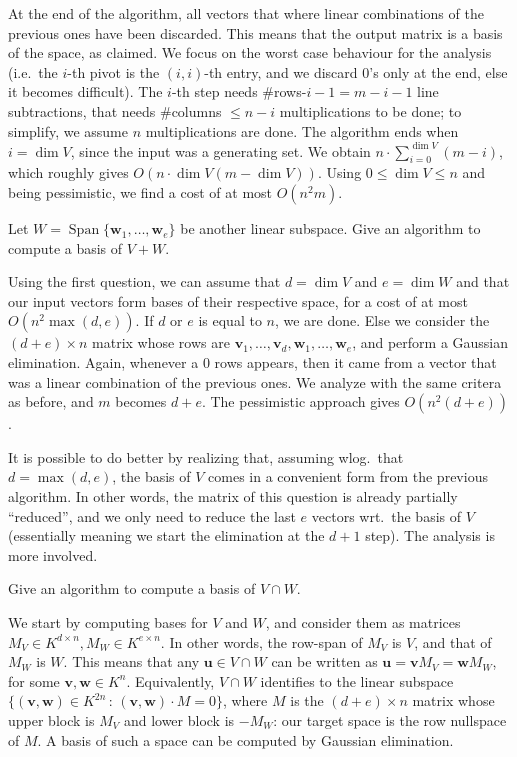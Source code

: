 \documentclass[11pt]{exam}
\theoremstyle{definition}
\DeclareMathOperator{\Span}{Span}
\newcommand{\vc}[1]{\mathbf{#1}}
\begin{document}
{\begin{questions}
\begin{solution}
    At the end of the algorithm, all vectors that where linear combinations of the previous ones have been discarded. This means that the output matrix is a basis of the space, as claimed. We focus on the worst case behaviour for the analysis (i.e.~the $i$-th pivot is the $(i,i)$-th entry, and we discard $0$'s only at the end, else it becomes difficult). The $i$-th step needs $\#$rows-$i-1=m-i-1$ line subtractions, that needs $\#$columns $\leq n-i$ multiplications to be done; to simplify, we assume $n$ multiplications are done. The algorithm ends when $i=\dim V$, since the input was a generating set. We obtain $n\cdot \sum_{i=0}^{\dim V}(m-i)$, which roughly gives $O(n\cdot\dim V(m-\dim V))$. Using $0\leq \dim V\leq n$ and being pessimistic, we find a cost of at most $O(n^2m)$. 

  \end{solution}

  \question Let $W=\Span\{ \vc w_1,\dotsc, \vc w_e\}$ be another linear subspace. Give an algorithm to compute a basis of $V+W$.

  \begin{solution}
    Using the first question, we can assume that $d=\dim V$ and $e=\dim W$ and that our input vectors form bases of their respective space, for a cost of at most $O(n^2\max(d,e))$. If $d$ or $e$ is equal to $n$, we are done. Else we consider the $(d+e)\times n$ matrix whose rows are $\vc v_1,\dotsc, \vc v_d,\vc w_1, \dotsc, \vc w_e$, and perform a Gaussian elimination. Again, whenever a $0$ rows appears, then it came from a vector that was a linear combination of the previous ones. We analyze with the same critera as before, and $m$ becomes $d+e$. The pessimistic approach gives $O(n^2(d+e))$.
    
    It is possible to do better by realizing that, assuming wlog.~that $d=\max(d,e)$, the basis of $V$ comes in a convenient form from the previous algorithm. In other words, the matrix of this question is already partially ``reduced'', and we only need to reduce the last $e$ vectors wrt.~the basis of $V$ (essentially meaning we start the elimination at the $d+1$ step). The analysis is more involved.    
  \end{solution}
    
  \question Give an algorithm to compute a basis of $V \cap W$.

  \begin{solution}
    We start by computing bases for $V$ and $W$, and consider them as matrices $M_V \in K^{d\times n}, M_W \in K^{e\times n}$. In other words, the row-span of $M_V$ is $V$, and that of $M_W$ is $W$. This means that any $\vc u\in V\cap W$ can be written as $\vc u=\vc vM_V=\vc wM_W$, for some $\vc v, \vc w \in K^n$. Equivalently, $V\cap W$ identifies to the linear subspace $\{ (\vc v,\vc w) \in K^{2n}\,:\, (\vc v, \vc w)\cdot M =0\}$, where $M$ is the $(d+e)\times n$ matrix whose upper block is $M_V$ and lower block is $-M_W$: our target space is the row nullspace of $M$. A basis of such a space can be computed by Gaussian elimination.
    

\end{solution}
\end{questions}}
\end{document}
